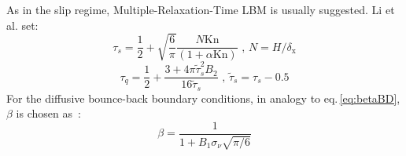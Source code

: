 As in the slip regime, Multiple-Relaxation-Time LBM is usually suggested. Li et al. set:
\begin{equation}
 \tau_s = \frac{1}{2} + \sqrt{\frac{6}{\pi}} \frac{N \mathrm{Kn}}{(1+\alpha \mathrm{Kn})} \textrm{ , \ } N=H/\delta_\mathrm{x}
\end{equation}
\begin{equation}
 \tau_q = \frac{1}{2} + \frac{3 + 4 \pi \tilde{\tau}_s^2 B_2}{16 \tilde{\tau}_s } \textrm{ , \ } \tilde{\tau}_s = \tau_s - 0.5
\end{equation}
For the diffusive bounce-back boundary conditions, in analogy to eq.\,\ref{eq:betaBD},
$\beta$ is chosen as~\cite{Li2011}:
\begin{equation}
 \beta = \frac{1}{1 + B_1 \sigma_\nu \sqrt{\pi / 6}}
\end{equation}
